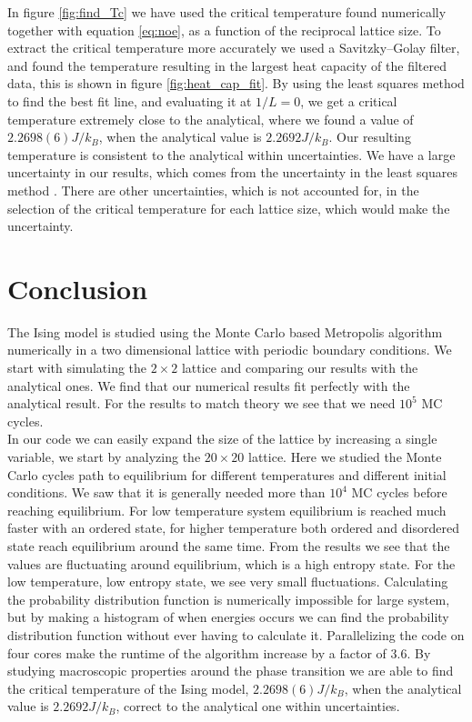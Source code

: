\documentclass[%
 reprint,
nofootinbib,
aps,
]{revtex4-1}
\begin{document}
In figure \vref{fig:find_Tc} we have used the critical temperature found numerically together with equation \eqref{eq:noe}, as a function of the reciprocal lattice size. To extract the critical temperature more accurately we used a Savitzky–Golay filter, and found the temperature resulting in the largest heat capacity of the filtered data, this is shown in figure \vref{fig:heat_cap_fit}. By using the least squares method to find the best fit line, and evaluating it at $1/L=0$, we get a critical temperature extremely close to the analytical, where we found a value of $2.2698(6)J/k_B$, when the analytical value is $ 2.2692J/k_B$. Our resulting temperature is consistent to the analytical within uncertainties. We have a large uncertainty in our results, which comes from the uncertainty in the least squares method \cite{squires}. There are other uncertainties, which is not accounted for, in the selection of the critical temperature for each lattice size, which would make the uncertainty.

\section{Conclusion}
The Ising model is studied using the Monte Carlo based Metropolis algorithm numerically in a two dimensional lattice with periodic boundary conditions. We start with simulating the $2\times 2$ lattice and comparing our results with the analytical ones. We find that our numerical results fit perfectly with the analytical result. For the results to match theory we see that we need $10^5$ MC cycles.\\
In our code we can easily expand the size of the lattice by increasing a single variable, we start by analyzing the $20\times 20$ lattice. Here we studied the Monte Carlo cycles path to equilibrium for different temperatures and different initial conditions. We saw that it is generally needed more than $10^4$ MC cycles before reaching equilibrium. For low temperature system equilibrium is reached much faster with an ordered state, for higher temperature both ordered and disordered state reach equilibrium around the same time. From the results we see that the values are fluctuating around equilibrium, which is a high entropy state. For the low temperature, low entropy state, we see very small fluctuations. Calculating the probability distribution function is numerically impossible for large system, but by making a histogram of when energies occurs we can find the probability distribution function without ever having to calculate it. Parallelizing the code on four cores make the runtime of the algorithm increase by a factor of $3.6$. By studying macroscopic properties around the phase transition we are able to find the critical temperature of the Ising model, $2.2698(6)J/k_B$, when the analytical value is $ 2.2692J/k_B$, correct to the analytical one within uncertainties.
\end{document}
